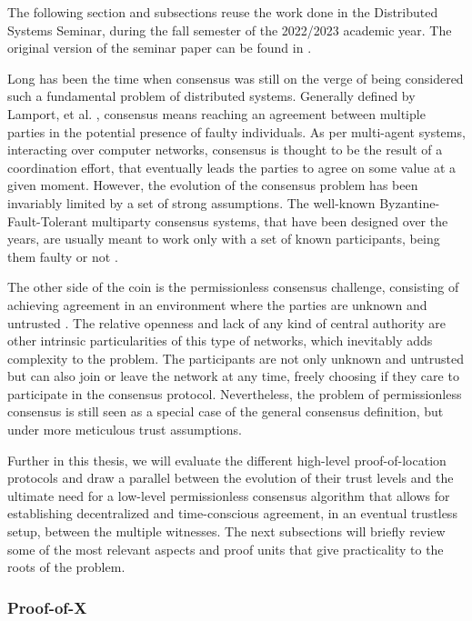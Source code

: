 The following section and subsections reuse the work done in the Distributed Systems Seminar, during the fall semester of the 2022/2023 academic year. The original version of the seminar paper can be found in \cite{units-of-permissionless-consensus}.

Long has been the time when consensus was still on the verge of being considered such a fundamental problem of distributed systems. Generally defined by Lamport, et al. \cite{pease1980reaching, lamport2019byzantine}, consensus means reaching an agreement between multiple parties in the potential presence of faulty individuals. As per multi-agent systems, interacting over computer networks, consensus is thought to be the result of a coordination effort, that eventually leads the parties to agree on some value at a given moment. However, the evolution of the consensus problem has been invariably limited by a set of strong assumptions. The well-known Byzantine-Fault-Tolerant multiparty consensus systems, that have been designed over the years, are usually meant to work only with a set of known participants, being them faulty or not \cite{castro1999practical}. 

The other side of the coin is the permissionless consensus challenge, consisting of achieving agreement in an environment where the parties are unknown and untrusted \cite{nakamoto2008bitcoin, buterin2014next}. The relative openness and lack of any kind of central authority are other intrinsic particularities of this type of networks, which inevitably adds complexity to the problem. The participants are not only unknown and untrusted but can also join or leave the network at any time, freely choosing if they care to participate in the consensus protocol. Nevertheless, the problem of permissionless consensus is still seen as a special case of the general consensus definition, but under more meticulous trust assumptions.

Further in this thesis, we will evaluate the different high-level proof-of-location protocols and draw a parallel between the evolution of their trust levels and the ultimate need for a low-level permissionless consensus algorithm that allows for establishing decentralized and time-conscious agreement, in an eventual trustless setup, between the multiple witnesses. The next subsections will briefly review some of the most relevant aspects and proof units that give practicality to the roots of the problem.

\subsubsection{Proof-of-X}

